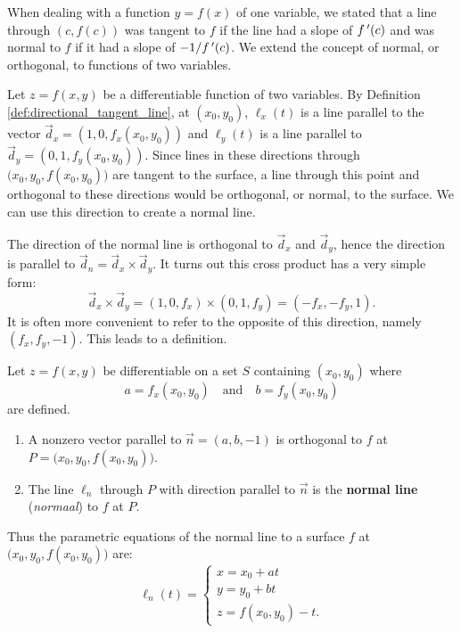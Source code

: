 When dealing with a function $y=f(x)$ of one variable, we stated that a line through $(c,f(c))$ was tangent to $f$ if the line had a slope of $f\,'(c)$ and was normal to $f$ if it had a slope of $-1/f\,'(c)$. We extend the concept of normal, or orthogonal, to functions of two variables. 

Let $z=f(x,y)$ be a differentiable function of two variables. By Definition \ref{def:directional_tangent_line}, at $(x_0,y_0)$, $\ell_x(t)$ is a line parallel to the vector $\vec d_x=\left( 1,0,f_x(x_0,y_0)\right)$ and $\ell_y(t)$ is a line parallel to $\vec d_y=\left( 0,1,f_y(x_0,y_0)\right)$. Since lines in these directions through $\big(x_0,y_0,f(x_0,y_0)\big)$ are tangent to the surface, a line through this point and orthogonal to these directions would be orthogonal, or normal, to the surface. We can use this direction to create a normal line.

The direction of the normal line is orthogonal to $\vec d_x$ and $\vec d_y$, hence the direction is parallel to \linebreak $\vec d_n = \vec d_x\times \vec d_y$. It turns out this cross product has a very simple form:
$$ \vec d_x\times \vec d_y = \left( 1,0,f_x\right) \times \left( 0,1,f_y\right) = \left( -f_x,-f_y,1\right).$$
It is often more convenient to refer to the opposite of this direction, namely $\left( f_x,f_y,-1\right)$. This leads to a definition.


\begin{definition}\label{def:normal_line_space}
Let $z=f(x,y)$ be differentiable on a set $S$ containing $(x_0,y_0)$ where
$$a = f_x(x_0,y_0) \quad \text{and}\quad b=f_y(x_0,y_0)$$
are defined.

\begin{enumerate}
\item	A nonzero vector parallel to $\vec n=\left( a,b,-1\right)$ is orthogonal to $f$ at $P=\big(x_0,y_0,f(x_0,y_0)\big)$.

\item The line $\ell_n$ through $P$ with direction parallel to $\vec n$ is the \textbf{normal line} (\textit{normaal}) to $f$ at $P$.
\end{enumerate}
\end{definition}

Thus the parametric equations of the normal line to a surface $f$ at $\big(x_0,y_0,f(x_0,y_0)\big)$ are:
$$\ell_{n}(t) = \left\{\begin{array}{l} x= x_0+at\\ y = y_0 + bt \\ z = f(x_0,y_0) - t. \end{array}\right.$$


